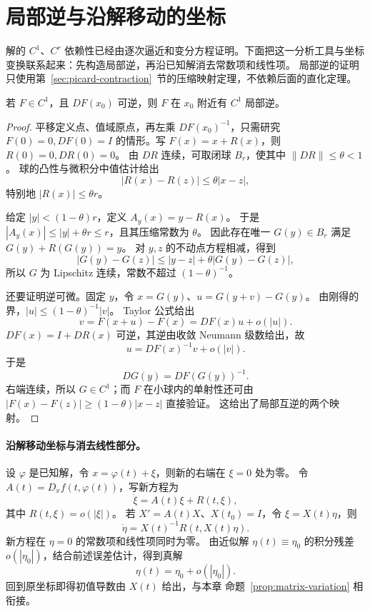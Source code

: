 \section{局部逆与沿解移动的坐标}\label{sec:inverse-moving-coordinates}
解的 $C^1$、$C^r$ 依赖性已经由逐次逼近和变分方程证明。下面把这一分析工具与坐标变换联系起来：先构造局部逆，再沿已知解消去常数项和线性项。
局部逆的证明只使用第~\ref{sec:picard-contraction}~节的压缩映射定理，不依赖后面的直化定理。
\begin{theorem}[由压缩映射得到局部逆]\label{thm:local-inverse}
若 $F\in C^1$，且 $DF(x_0)$ 可逆，则 $F$ 在 $x_0$ 附近有 $C^1$ 局部逆。
\end{theorem}
\begin{proof}
平移定义点、值域原点，再左乘 $DF(x_0)^{-1}$，只需研究
$F(0)=0,DF(0)=I$ 的情形。写 $F(x)=x+R(x)$，则 $R(0)=0,DR(0)=0$。
由 $DR$ 连续，可取闭球 $B_r$，使其中 $\|DR\|\leq\theta<1$。
球的凸性与微积分中值估计给出
\[
 |R(x)-R(z)|\leq\theta|x-z|,
\]
特别地 $|R(x)|\leq\theta r$。

给定 $|y|<(1-\theta)r$，定义 $A_y(x)=y-R(x)$。
于是 $|A_y(x)|\leq|y|+\theta r\leq r$，且其压缩常数为 $\theta$。
因此存在唯一 $G(y)\in B_r$ 满足 $G(y)+R(G(y))=y$。
对 $y,z$ 的不动点方程相减，得到
\[
 |G(y)-G(z)|\leq|y-z|+\theta|G(y)-G(z)|,
\]
所以 $G$ 为 Lipschitz 连续，常数不超过 $(1-\theta)^{-1}$。

还要证明逆可微。固定 $y$，令 $x=G(y)$、$u=G(y+v)-G(y)$。
由刚得的界，$|u|\leq(1-\theta)^{-1}|v|$。
Taylor 公式给出 
\[
 v=F(x+u)-F(x)=DF(x)u+o(|u|).
\]
$DF(x)=I+DR(x)$ 可逆，其逆由收敛 Neumann 级数给出，故
\[
 u=DF(x)^{-1}v+o(|v|).
\]
于是 
\[
 DG(y)=DF(G(y))^{-1}.
\]
右端连续，所以 $G\in C^1$；而 $F$ 在小球内的单射性还可由
$|F(x)-F(z)|\geq(1-\theta)|x-z|$ 直接验证。
这给出了局部互逆的两个映射。
\end{proof}

\paragraph{沿解移动坐标与消去线性部分。}
设 $\varphi$ 是已知解，令 $x=\varphi(t)+\xi$，则新的右端在 $\xi=0$ 处为零。
令 $A(t)=D_xf(t,\varphi(t))$，写新方程为
\[
 \dot\xi=A(t)\xi+R(t,\xi),
\]
其中 $R(t,\xi)=o(|\xi|)$。
若 $X'=A(t)X$、$X(t_0)=I$，令 $\xi=X(t)\eta$，则
\[
 \dot\eta=X(t)^{-1}R(t,X(t)\eta).
\]
新方程在 $\eta=0$ 的常数项和线性项同时为零。
由近似解 $\eta(t)\equiv\eta_0$ 的积分残差
$o(|\eta_0|)$，结合前述误差估计，得到真解
\[
 \eta(t)=\eta_0+o(|\eta_0|).
\]
回到原坐标即得初值导数由 $X(t)$ 给出，与本章
命题~\ref{prop:matrix-variation} 相衔接。
